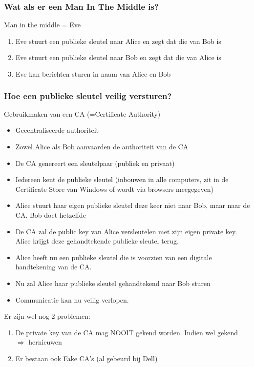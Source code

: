 \documentclass{article}
\begin{document}
\subsubsection{Wat als er een Man In The Middle is?}

Man in the middle = Eve

\begin{enumerate}
    \item Eve stuurt een publieke sleutel naar Alice en zegt dat die van Bob is
    \item Eve stuurt een publieke sleutel naar Bob en zegt dat die van Alice is
    \item Eve kan berichten sturen in naam van Alice en Bob
\end{enumerate}

\subsubsection{Hoe een publieke sleutel veilig versturen?}

Gebruikmaken van een CA (=Certificate Authority)

\begin{itemize}
    \item Gecentraliseerde authoriteit
    \item Zowel Alice als Bob aanvaarden de authoriteit van de CA
    \item De CA genereert een sleutelpaar (publiek en privaat)
    \item Iedereen kent de publieke sleutel (inbouwen in alle computers, zit in de Certificate Store van Windows of wordt via browsers meegegeven)
    \item Alice stuurt haar eigen publieke sleutel deze keer niet naar Bob, maar naar de CA. Bob doet hetzelfde
    \item De CA zal de public key van Alice versleutelen met zijn eigen private key. Alice krijgt deze gehandtekende publieke sleutel terug.
    \item Alice heeft nu een publieke sleutel die is voorzien van een digitale handtekening van de CA.
    \item Nu zal Alice haar publieke sleutel gehandtekend naar Bob sturen
    \item Communicatie kan nu veilig verlopen.
\end{itemize}

Er zijn wel nog 2 problemen:

\begin{enumerate}
    \item De private key van de CA mag NOOIT gekend worden. Indien wel gekend $\Rightarrow$ hernieuwen
    \item Er bestaan ook Fake CA's (al gebeurd bij Dell)
\end{enumerate}
\end{document}
